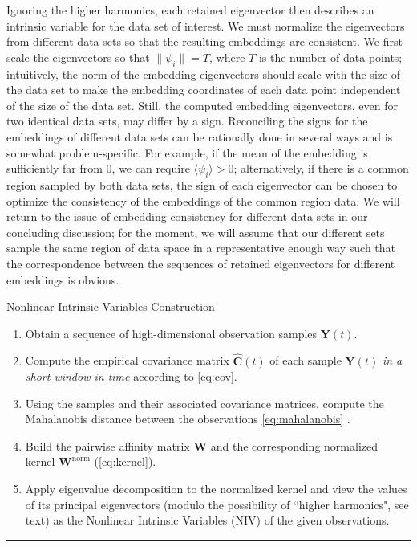 \documentclass[aip,jcp,preprint]{revtex4-1}
\begin{document}
Ignoring the higher harmonics, each retained eigenvector then describes an intrinsic variable for the data set of interest.
%
We must normalize the eigenvectors from different data sets so that the resulting embeddings are consistent.
%
We first scale the eigenvectors so that $\|\psi_i\| = T$, where $T$ is the number of data points;
intuitively, the norm of the embedding eigenvectors should scale with the size of the data set to make the embedding coordinates of each data point independent of the size of the data set.
%
Still, the computed embedding eigenvectors, even for two identical data sets, may differ by a sign.
%
Reconciling the signs for the embeddings of different data sets can be rationally done in several ways and is somewhat problem-specific.
%
For example, if the mean of the embedding is sufficiently far from 0, we can require $\langle \psi_i \rangle > 0$;
alternatively, if there is a common region sampled by both data sets, the sign of each eigenvector can be chosen to optimize the consistency of the embeddings of the common region data.
%
We will return to the issue of embedding consistency for different data sets in our concluding discussion; for the moment,
we will assume that our different sets sample the same region of data space in a representative enough way such that the
correspondence between the sequences of retained eigenvectors for different embeddings is obvious.

\begin{algorithm}[th!]
\caption{Nonlinear Intrinsic Variables Construction}
\begin{enumerate}

\item
Obtain a sequence of high-dimensional observation samples $\mathbf{Y}(t)$.

\item
Compute the empirical covariance matrix $\widehat{\mathbf{C}}(t)$ of each sample $\mathbf{Y}(t)$ {\em in a short window in time} according to \eqref{eq:cov}.

\item
Using the samples and their associated covariance matrices, compute the Mahalanobis distance between the observations \eqref{eq:mahalanobis} .

\item
Build the pairwise affinity matrix $\mathbf{W}$ and the corresponding normalized kernel $\mathbf{W}^{\mathrm{norm}}$ (\ref{eq:kernel}).

\item
Apply eigenvalue decomposition to the normalized kernel and view the values of its principal eigenvectors (modulo the possibility of
 ``higher harmonics", see text) as the Nonlinear Intrinsic Variables (NIV) of the given observations.

\end{enumerate}
\hrule
\label{algo}
\end{algorithm}
\end{document}
